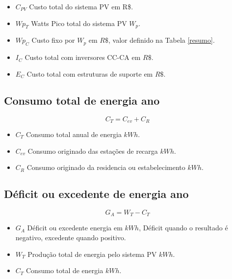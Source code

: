 \begin{itemize}
  \item $C_{PV}$ Custo total do sistema PV em R\$.

  \item $Wp_{T}$ Watts Pico total do sistema PV $W_{p}$.
  
  \item $Wp_{C}$ Custo fixo por $W_{p}$ em $R\$$, valor definido na Tabela \ref{resumo}.
  
  \item $I_{C}$ Custo total com inversores CC-CA em $R\$$.
  
  \item $E_{C}$ Custo total com estruturas de suporte em $R\$$.

\end{itemize}

\subsection{Consumo total de energia ano}

\begin{equation}
    C_{T} = C_{ev} + C_{R}
    \label{eq:EV_custo}
\end{equation}

\begin{itemize}
  \item $C_{T}$ Consumo total anual de energia $kWh$.

  \item $C_{ev}$ Consumo originado das estações de recarga $kWh$.
  
  \item $C_{R}$ Consumo originado da residencia ou estabelecimento $kWh$.

\end{itemize}

\subsection{Déficit ou excedente de energia ano}

\begin{equation}
    G_{A} = W_{T} - C_{T}
    \label{eq:EV_custo}
\end{equation}

\begin{itemize}
  \item $G_{A}$ Déficit ou excedente energia em $kWh$, Déficit quando o resultado é negativo, excedente quando positivo.

  \item $W_{T}$ Produção total de energia pelo sistema PV $kWh$.
  
  \item $C_{T}$ Consumo total de energia $kWh$.

\end{itemize}

